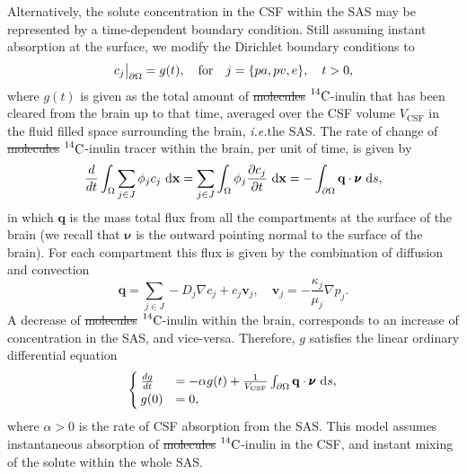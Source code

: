 \documentclass[10pt]{article}
\newcommand\restr[2]{{%
\left.\kern-\nulldelimiterspace %
#1 %
\vphantom{\big|} %
\right|_{#2} %
}}
\newcommand{\ie}{\emph{i.e.}\;}
\newcommand{\1}{^{(1)}}
\newcommand{\2}{^{(2)}}
\newcommand*{\dd}{\mathop{\kern0pt\mathrm{d}}\!{}}
\newcommand {\x}   {\mathbf{x}}
\newcommand{\Cinulin}{$\prescript{14}{}{\text{C}}$-inulin }
\providecommand{\DIFdeltex}[1]{{\protect\color{red}\sout{#1}}}                      %
\providecommand{\DIFaddbegin}{} %
\providecommand{\DIFaddend}{} %
\providecommand{\DIFdelbegin}{} %
\providecommand{\DIFdelend}{} %
\providecommand{\DIFdel}[1]{\texorpdfstring{\DIFdeltex{#1}}{}} %
\newcommand{\DIFscaledelfig}{0.5}
\newlength{\DIFdelgraphicswidth} %
\newlength{\DIFdelgraphicsheight} %
\newcommand{\DIFaddincludegraphics}[2][]{{\color{blue}\fbox{\DIFOincludegraphics[#1]{#2}}}} %
\newcommand{\DIFdelincludegraphics}[2][]{%
\sbox{\DIFdelgraphicsbox}{\DIFOincludegraphics[#1]{#2}}%
\settoboxwidth{\DIFdelgraphicswidth}{\DIFdelgraphicsbox} %
\settoboxtotalheight{\DIFdelgraphicsheight}{\DIFdelgraphicsbox} %
\scalebox{\DIFscaledelfig}{%
\parbox[b]{\DIFdelgraphicswidth}{\usebox{\DIFdelgraphicsbox}\\[-\baselineskip] \rule{\DIFdelgraphicswidth}{0em}}\llap{\resizebox{\DIFdelgraphicswidth}{\DIFdelgraphicsheight}{%
\setlength{\unitlength}{\DIFdelgraphicswidth}%
\begin{picture}(1,1)%
\thicklines\linethickness{2pt} %
{\color[rgb]{1,0,0}\put(0,0){\framebox(1,1){}}}%
{\color[rgb]{1,0,0}\put(0,0){\line( 1,1){1}}}%
{\color[rgb]{1,0,0}\put(0,1){\line(1,-1){1}}}%
\end{picture}%
}\hspace*{3pt}}} %
} %
\DeclareRobustCommand{\DIFaddbegin}{\DIFOaddbegin \let\includegraphics\DIFaddincludegraphics} %
\DeclareRobustCommand{\DIFaddend}{\DIFOaddend \let\includegraphics\DIFOincludegraphics} %
\DeclareRobustCommand{\DIFdelbegin}{\DIFOdelbegin \let\includegraphics\DIFdelincludegraphics} %
\DeclareRobustCommand{\DIFdelend}{\DIFOaddend \let\includegraphics\DIFOincludegraphics} %
\begin{document}
Alternatively, the solute concentration in the CSF within the SAS may be represented by a time-dependent boundary condition. Still assuming instant absorption at the surface, we modify the Dirichlet boundary conditions to
\begin{equation}
     \restr{c_j}{\partial \Omega} =  g(t),\quad \text{for}\quad j=\{pa,pv,e \}, \quad t >0,
    \label{eq:inulin-inhomogeneous-dirichlet}
\end{equation}
where $ g(t)$ is given as the total amount of \DIFdelbegin \DIFdel{molecules }\DIFdelend \DIFaddbegin \Cinulin \DIFaddend that has been cleared from the brain up to that time, averaged over the CSF volume $ V_\text{CSF} $ in the fluid filled space surrounding the brain, \ie the SAS. The rate of change of \DIFdelbegin \DIFdel{molecules }\DIFdelend \DIFaddbegin \Cinulin \DIFaddend tracer within the brain, per unit of time, is given by
\begin{equation}
    \frac{d}{dt}\int_{\Omega} \sum_{j\in J} \phi_j c_j \,\dd \x= \sum_{j\in J} \int_{\Omega} \phi_j \frac{\partial c_j}{\partial t} \,\dd \x=   - \int_{\partial \Omega}  \mathbf{q} \cdot \pmb{\nu} \,\dd s  ,
\end{equation}
in which $\mathbf{q}$ is the mass total flux from all the compartments at the surface of the brain (we recall that $\pmb{\nu}$ is the outward pointing normal to the surface of the brain). 
For each compartment this flux is given by the combination of diffusion and convection 
\[
    \mathbf{q} =  \sum_{j\in J}  - D_j\nabla c_j + c_j \mathbf{v}_j,\quad \mathbf{v}_j = -\frac{\kappa_j}{\mu_j}\nabla p_j.   
\]
A decrease of \DIFdelbegin \DIFdel{molecules }\DIFdelend \DIFaddbegin \Cinulin \DIFaddend within the brain, corresponds to an increase of concentration in the SAS, and vice-versa. Therefore, $g$ satisfies the linear ordinary differential equation 
\begin{equation}
    \begin{cases}
        \frac{dg}{dt} &= - \alpha g(t)  + \frac{1}{V_\text{CSF}} \int_{\partial \Omega}  \mathbf{q} \cdot\pmb{\nu}\,\dd s, \\
        g(0) &= 0,
    \end{cases}
    \label{eq:inulin-boundary-inhomogeneous}
\end{equation}
where $\alpha > 0$ is the rate of CSF absorption from the SAS. 
This model assumes instantaneous absorption of \DIFdelbegin \DIFdel{molecules }\DIFdelend \DIFaddbegin \Cinulin \DIFaddend in the CSF, and instant mixing of the solute within the whole SAS. %
\end{document}
